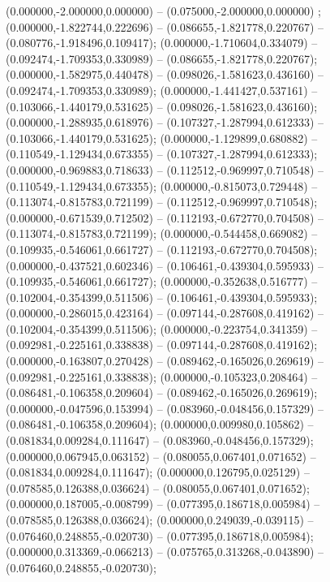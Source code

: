  (0.000000,-2.000000,0.000000) -- (0.075000,-2.000000,0.000000) ;
 (0.000000,-1.822744,0.222696) -- (0.086655,-1.821778,0.220767) -- (0.080776,-1.918496,0.109417);
 (0.000000,-1.710604,0.334079) -- (0.092474,-1.709353,0.330989) -- (0.086655,-1.821778,0.220767);
 (0.000000,-1.582975,0.440478) -- (0.098026,-1.581623,0.436160) -- (0.092474,-1.709353,0.330989);
 (0.000000,-1.441427,0.537161) -- (0.103066,-1.440179,0.531625) -- (0.098026,-1.581623,0.436160);
 (0.000000,-1.288935,0.618976) -- (0.107327,-1.287994,0.612333) -- (0.103066,-1.440179,0.531625);
 (0.000000,-1.129899,0.680882) -- (0.110549,-1.129434,0.673355) -- (0.107327,-1.287994,0.612333);
 (0.000000,-0.969883,0.718633) -- (0.112512,-0.969997,0.710548) -- (0.110549,-1.129434,0.673355);
 (0.000000,-0.815073,0.729448) -- (0.113074,-0.815783,0.721199) -- (0.112512,-0.969997,0.710548);
 (0.000000,-0.671539,0.712502) -- (0.112193,-0.672770,0.704508) -- (0.113074,-0.815783,0.721199);
 (0.000000,-0.544458,0.669082) -- (0.109935,-0.546061,0.661727) -- (0.112193,-0.672770,0.704508);
 (0.000000,-0.437521,0.602346) -- (0.106461,-0.439304,0.595933) -- (0.109935,-0.546061,0.661727);
 (0.000000,-0.352638,0.516777) -- (0.102004,-0.354399,0.511506) -- (0.106461,-0.439304,0.595933);
 (0.000000,-0.286015,0.423164) -- (0.097144,-0.287608,0.419162) -- (0.102004,-0.354399,0.511506);
 (0.000000,-0.223754,0.341359) -- (0.092981,-0.225161,0.338838) -- (0.097144,-0.287608,0.419162);
 (0.000000,-0.163807,0.270428) -- (0.089462,-0.165026,0.269619) -- (0.092981,-0.225161,0.338838);
 (0.000000,-0.105323,0.208464) -- (0.086481,-0.106358,0.209604) -- (0.089462,-0.165026,0.269619);
 (0.000000,-0.047596,0.153994) -- (0.083960,-0.048456,0.157329) -- (0.086481,-0.106358,0.209604);
 (0.000000,0.009980,0.105862) -- (0.081834,0.009284,0.111647) -- (0.083960,-0.048456,0.157329);
 (0.000000,0.067945,0.063152) -- (0.080055,0.067401,0.071652) -- (0.081834,0.009284,0.111647);
 (0.000000,0.126795,0.025129) -- (0.078585,0.126388,0.036624) -- (0.080055,0.067401,0.071652);
 (0.000000,0.187005,-0.008799) -- (0.077395,0.186718,0.005984) -- (0.078585,0.126388,0.036624);
 (0.000000,0.249039,-0.039115) -- (0.076460,0.248855,-0.020730) -- (0.077395,0.186718,0.005984);
 (0.000000,0.313369,-0.066213) -- (0.075765,0.313268,-0.043890) -- (0.076460,0.248855,-0.020730);
